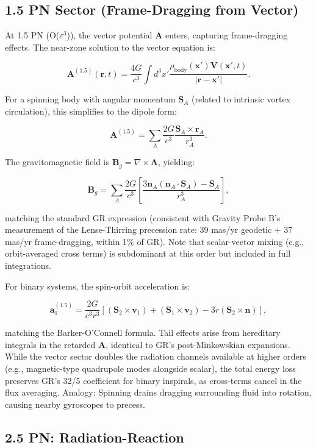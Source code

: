 \documentclass{article}
\begin{document}
\subsection{1.5 PN Sector (Frame-Dragging from Vector)}

At 1.5 PN (O($\varepsilon^3$)), the vector potential $\mathbf{A}$ enters, capturing frame-dragging effects. The near-zone solution to the vector equation is:

\[
\mathbf{A}^{(1.5)}(\mathbf{r}, t) = \frac{4 G}{c^3} \int d^3 x' \frac{\rho_{\text{body}}(\mathbf{x}') \mathbf{V}(\mathbf{x}', t)}{|\mathbf{r} - \mathbf{x}'|}.
\]

For a spinning body with angular momentum $\mathbf{S}_A$ (related to intrinsic vortex circulation), this simplifies to the dipole form:

\[
\mathbf{A}^{(1.5)} = \sum_A \frac{2 G}{c^3} \frac{\mathbf{S}_A \times \mathbf{r}_A}{r_A^3}.
\]

The gravitomagnetic field is $\mathbf{B}_g = \nabla \times \mathbf{A}$, yielding:

\[
\mathbf{B}_g = \sum_A \frac{2 G}{c^3} \left[ \frac{3 \mathbf{n}_A (\mathbf{n}_A \cdot \mathbf{S}_A) - \mathbf{S}_A}{r_A^3} \right],
\]

matching the standard GR expression (consistent with Gravity Probe B's measurement of the Lense-Thirring precession rate: 39 mas/yr geodetic + 37 mas/yr frame-dragging, within 1\% of GR). Note that scalar-vector mixing (e.g., orbit-averaged cross terms) is subdominant at this order but included in full integrations.

For binary systems, the spin-orbit acceleration is:

\[
\mathbf{a}_1^{(1.5)} = \frac{2G}{c^3 r^3} [ (\mathbf{S}_2 \times \mathbf{v}_1) + (\mathbf{S}_1 \times \mathbf{v}_2) - 3 \dot{r} (\mathbf{S}_2 \times \mathbf{n}) ],
\]

matching the Barker-O'Connell formula. Tail effects arise from hereditary integrals in the retarded $\mathbf{A}$, identical to GR's post-Minkowskian expansions. While the vector sector doubles the radiation channels available at higher orders (e.g., magnetic-type quadrupole modes alongside scalar), the total energy loss preserves GR's 32/5 coefficient for binary inspirals, as cross-terms cancel in the flux averaging. Analogy: Spinning drains dragging surrounding fluid into rotation, causing nearby gyroscopes to precess.

\subsection{2.5 PN: Radiation-Reaction}
\end{document}
